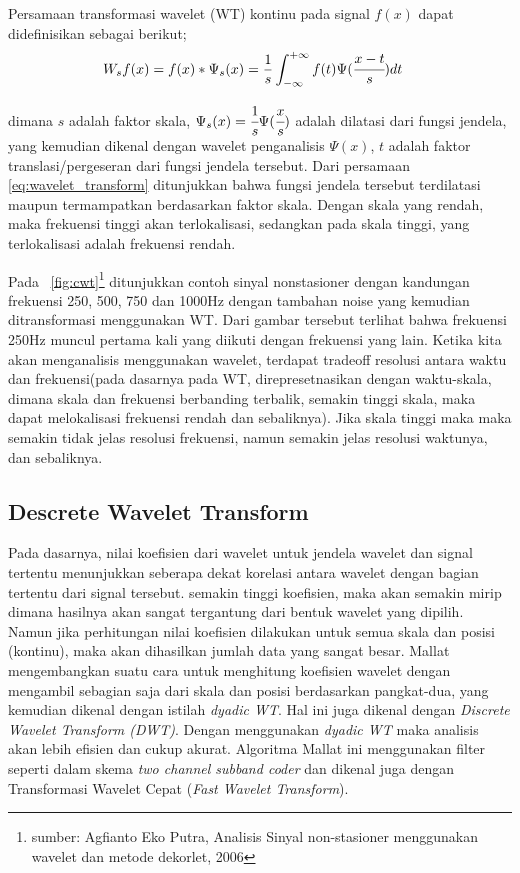 Persamaan transformasi wavelet (WT) kontinu pada signal $f(x)$ dapat
didefinisikan sebagai berikut;
\begin{align}
\label{eq:wavelet_transform}
	W_{s}f(x) &= f(x) * \Psi_{s}(x) = \frac{1}{s}\int^{+\infty}_{-\infty}f(t)
	\Psi(\cfrac{x - t}{s})dt
\end{align}

\noindent dimana $s$ adalah faktor skala,  $\Psi_{s}(x) =
\cfrac{1}{s}\Psi(\cfrac{x}{s})$ adalah dilatasi dari fungsi jendela, yang
kemudian dikenal dengan wavelet penganalisis $\Psi(x)$, $t$ adalah  faktor
translasi/pergeseran dari fungsi jendela tersebut. Dari persamaan
\ref{eq:wavelet_transform} ditunjukkan bahwa fungsi jendela tersebut terdilatasi
maupun termampatkan berdasarkan faktor skala. Dengan skala yang rendah, maka
frekuensi tinggi akan terlokalisasi, sedangkan pada skala tinggi, yang
terlokalisasi adalah frekuensi rendah. 


Pada \pic~\ref{fig:cwt}\footnote{sumber: Agfianto Eko Putra, Analisis Sinyal
non-stasioner menggunakan wavelet dan metode dekorlet, 2006} ditunjukkan contoh
sinyal nonstasioner dengan kandungan frekuensi 250, 500, 750 dan 1000Hz dengan
tambahan noise yang kemudian ditransformasi menggunakan WT. Dari gambar tersebut
terlihat bahwa frekuensi 250Hz muncul pertama kali yang diikuti dengan frekuensi
yang lain. Ketika kita akan menganalisis menggunakan wavelet, terdapat tradeoff
resolusi antara waktu dan frekuensi(pada dasarnya pada WT, direpresetnasikan
dengan waktu-skala, dimana skala dan frekuensi berbanding terbalik, semakin
tinggi skala, maka dapat melokalisasi frekuensi rendah dan sebaliknya). Jika
skala tinggi maka maka semakin tidak jelas resolusi frekuensi, namun semakin
jelas resolusi waktunya, dan sebaliknya.

\subsection{Descrete Wavelet Transform}
Pada dasarnya, nilai koefisien dari wavelet untuk jendela wavelet dan
signal tertentu menunjukkan seberapa dekat korelasi antara wavelet 
dengan bagian tertentu dari signal tersebut. semakin tinggi koefisien, maka akan
semakin mirip dimana hasilnya akan sangat tergantung dari bentuk wavelet yang
dipilih\cite{wavelet:matlab}. Namun jika perhitungan nilai koefisien dilakukan
untuk semua skala dan posisi (kontinu), maka akan dihasilkan jumlah data yang
sangat besar. Mallat \cite{Mallat:1989} mengembangkan suatu cara untuk
menghitung koefisien wavelet dengan mengambil sebagian saja dari skala dan
posisi berdasarkan pangkat-dua, yang kemudian dikenal dengan istilah
\emph{dyadic WT}. Hal ini juga dikenal dengan \emph{Discrete Wavelet
Transform (DWT)}. Dengan menggunakan \emph{dyadic WT} maka analisis akan lebih
efisien dan cukup  akurat. Algoritma Mallat ini menggunakan filter seperti dalam
skema \emph{two channel subband coder} dan dikenal juga dengan Transformasi
Wavelet Cepat (\emph{Fast Wavelet Transform}).

